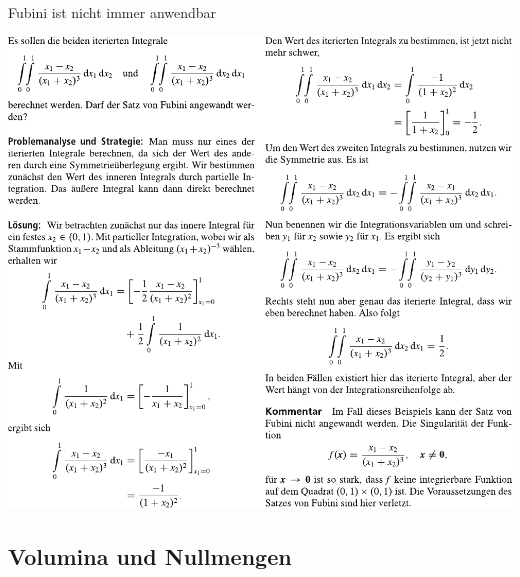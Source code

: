 \begin{Beispiel}{Fubini ist nicht immer anwendbar}
\begin{center}
    \includegraphics[width=\textwidth]{Dateien/Fubini.pdf}
\end{center}
\end{Beispiel}

\newpage
\subsection{Volumina und Nullmengen}

